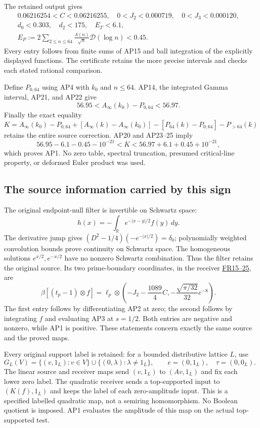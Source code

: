 The retained output gives
\[
\begin{gathered}
 0.06216254<C<0.06216255,\quad 0<J_2<0.000719,
 \quad0<J_3<0.000120,\\
 d_0<0.303,\quad d_2<175,\quad E_\Gamma<6.1,\\
 E_P:=2\sum_{2\le n\le64}\frac{\Lambda(n)}{\sqrt n}
                     \mathcal D(\log n)<0.45.
\end{gathered}\tag{AP24}
\]
Every entry follows from finite sums of AP15 and ball integration
of the explicitly displayed functions. The certificate retains the
more precise intervals and checks each stated rational comparison.

Define \(P_{0,64}\) using AP4 with \(k_0\) and \(n\le64\).
AP14, the integrated Gamma interval, AP21, and AP22 give
\[
 56.95<A_\infty(k_0)-P_{0,64}<56.97.\tag{AP25}
\]
Finally the exact equality
\[
 K=A_\infty(k_0)-P_{0,64}
 +[A_\infty(k)-A_\infty(k_0)]
 -[P_{64}(k)-P_{0,64}]-P_{>64}(k)\tag{AP26}
\]
retains the entire source correction. AP20 and AP23--25 imply
\[
 56.95-6.1-0.45-10^{-21}<K<56.97+6.1+0.45+10^{-21},
\]
which proves AP1. No zero table, spectral truncation, presumed
critical-line property, or deformed Euler product was used.

\subsection{The source information carried by this sign}
The original endpoint-null filter is invertible on Schwartz space:
\[
 h(x)=-\int_{\mathbb R}e^{-|x-y|/2}f(y)\,dy.
\]
The derivative jump gives
\((D^2-1/4)(-e^{-|x|/2})=\delta_0\); polynomially weighted
convolution bounds prove continuity on Schwartz space. The homogeneous
solutions \(e^{x/2},e^{-x/2}\) have no nonzero Schwartz combination.
Thus the filter retains the original source. Its two prime-boundary
coordinates, in the receiver
\href{https://github.com/KokunoYumeto/zeta-function-research-reader/blob/ec73ac350d0cda3d95c0bd1361bede33166b4d34/workbenches/splitzero-tandem/continuations/20260923-original-zeta-return/NOTE.tex}{FR15--25}, are
\[
 \beta[(t_p-1)\otimes f]
 =\ell_p\otimes\left(-J_2-\frac{1089}{4}C,
                  -\frac{\sqrt{\pi/32}}{32}e^{-8}\right).
 \tag{AP27}
\]
The first entry follows by differentiating AP2 at zero; the second
follows by integrating \(f\) and evaluating AP3 at \(s=1/2\).
Both entries are negative and nonzero, while AP1 is positive.
These statements concern exactly the same source and the proved maps.

Every original support label is retained: for a bounded distributive
lattice \(L\), use
\[
 G_L(V)=\{(v,1_L):v\in V\}\cup\{(0,\lambda):\lambda\ne1_L\},
 \qquad e=(0,1_L),\quad\tau=(0,0_L).\tag{AP28}
\]
The linear source and receiver
maps send \((v,1_L)\) to \((Av,1_L)\) and fix each lower zero
label. The quadratic receiver sends a top-supported input to
\((K(f),1_L)\) and keeps the label of each zero-amplitude input.
This is a specified labelled quadratic map, not a semiring
homomorphism. No Boolean quotient is imposed. AP1 evaluates the
amplitude of this map on the actual top-supported test.
